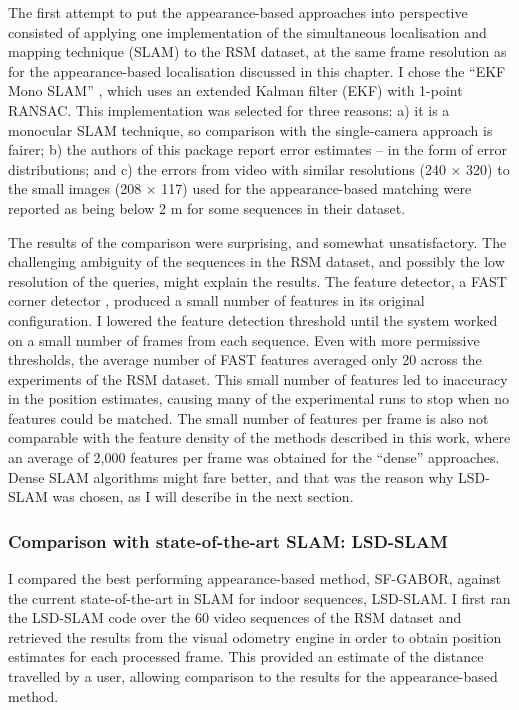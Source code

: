 The first attempt to put the appearance-based approaches into perspective consisted of applying one implementation of the simultaneous localisation and mapping technique (SLAM) to the RSM dataset, at the same frame resolution as for the appearance-based  localisation discussed in this chapter. I chose the ``EKF Mono SLAM'' \citep{civera20091}, which uses an extended Kalman filter (EKF) with 1-point RANSAC.  This implementation was selected for three reasons: a) it is a monocular SLAM technique, so comparison with the single-camera approach is fairer; b) the authors of this package report error estimates -- in the form of error distributions; and c) the errors from video with similar resolutions (240 $\times$ 320) to the small images (208 $\times$ 117) used for the appearance-based matching were reported as being below 2 m for some sequences \citep{civera20091} in their dataset.

The results of the comparison were surprising, and somewhat unsatisfactory. The challenging ambiguity of the sequences in the RSM dataset, and possibly the low resolution of the queries, might explain the results. The feature detector, a FAST corner detector \citep{rosten2006machine}, produced a small number of features in its original  configuration. I lowered the feature detection threshold until the system worked on a small number of frames from each sequence. Even with more permissive thresholds, the average number of FAST features averaged only 20 across the experiments of the RSM dataset. This small number of features led to inaccuracy in the position estimates, causing many of the experimental runs to stop when no features could be matched. The small number of features per frame is also not comparable with the feature density of the methods described in this work, where an average of 2,000 features per frame was obtained for the ``dense'' approaches. Dense SLAM algorithms might fare better, and that was the reason why LSD-SLAM was chosen, as I will describe in the next section.

\subsubsection{Comparison with state-of-the-art SLAM: LSD-SLAM}
\label{sec:comparisonSLAM}

I compared the best performing appearance-based method, SF-GABOR, against the current state-of-the-art in SLAM for indoor sequences, LSD-SLAM.  I first ran the LSD-SLAM code over the 60 video sequences of the RSM dataset and retrieved the results from the visual odometry engine in order to obtain position estimates for each processed frame.  This provided an estimate of the distance travelled by a user, allowing comparison to the results for the appearance-based method. 

